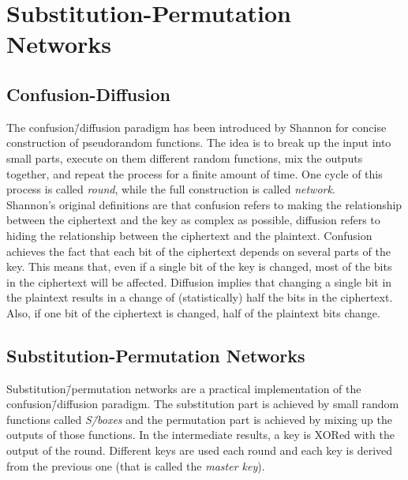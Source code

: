 \section{Substitution-Permutation Networks}
\subsection{Confusion-Diffusion}
The confusion\=/diffusion paradigm has been introduced by Shannon for concise construction of pseudorandom functions. The idea is to break up the input into small parts, execute on them different random functions, mix the outputs together, and repeat the process for a finite amount of time. One cycle of this process is called \emph{round}, while the full construction is called \emph{network}.\\
Shannon's original definitions are that confusion refers to making the relationship between the ciphertext and the key as complex as possible, diffusion refers to hiding the relationship between the ciphertext and the plaintext.
Confusion achieves the fact that each bit of the ciphertext depends on several parts of the key. This means that, even if a single bit of the key is changed, most of the bits in the ciphertext will be affected.
Diffusion implies that changing a single bit in the plaintext results in a change of (statistically) half the bits in the ciphertext. Also, if one bit of the ciphertext is changed, half of the plaintext bits change.

\subsection{Substitution-Permutation Networks}
Substitution\=/permutation networks are a practical implementation of the confusion\=/diffusion paradigm. The substitution part is achieved by small random functions called \emph{S\=/boxes} and the permutation part is achieved by mixing up the outputs of those functions. In the intermediate results, a key is XORed with the output of the round. Different keys are used each round and each key is derived from the previous one (that is called the \emph{master key}).
